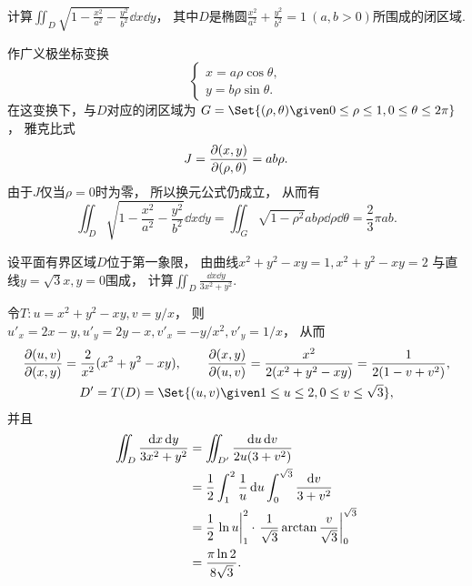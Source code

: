 \begin{example}
计算\(\iint_D \sqrt{1 - \frac{x^2}{a^2} - \frac{y^2}{b^2}} \dd{x} \dd{y}\)，
其中\(D\)是椭圆\(\frac{x^2}{a^2} + \frac{y^2}{b^2} = 1\ (a,b>0)\)所围成的闭区域.
\begin{solution}
作广义极坐标变换\[
	\left\{ \begin{array}{l}
		x = a \rho \cos\theta, \\
		y = b \rho \sin\theta.
	\end{array} \right.
\]
在这变换下，与\(D\)对应的闭区域为
\(G = \Set{(\rho,\theta) \given 0\leq\rho\leq1,0\leq\theta\leq2\pi}\)，
雅克比式\[
	J = \pdv{ (x,y) }{ (\rho,\theta) } = ab\rho.
\]
由于\(J\)仅当\(\rho=0\)时为零，
所以换元公式仍成立，
从而有\[
	\iint_D \sqrt{1 - \frac{x^2}{a^2} - \frac{y^2}{b^2}} \dd{x} \dd{y}
	= \iint_G \sqrt{1-\rho^2} ab\rho \dd{\rho} \dd{\theta}
	= \frac23 \pi ab.
\]
\end{solution}
\end{example}

\begin{example}
设平面有界区域\(D\)位于第一象限，
由曲线\(x^2+y^2-xy=1,
x^2+y^2-xy=2\)
与直线\(y=\sqrt3 x,
y=0\)围成，
计算\(\iint_D \frac{\dd{x}\dd{y}}{3x^2+y^2}\).
\begin{solution}
令\(T: u=x^2+y^2-xy,
v=y/x\)，
则\(u'_x=2x-y,
u'_y=2y-x,
v'_x=-y/x^2,
v'_y=1/x\)，
从而\begin{gather*}
	\jacobi{u,v}{x,y} = \frac2{x^2} (x^2+y^2-xy),
	\qquad
	\jacobi{x,y}{u,v} = \frac{x^2}{2(x^2+y^2-xy)}
	= \frac1{2(1-v+v^2)}, \\
	D' = T(D)
	= \Set{ (u,v) \given 1 \leq u \leq 2, 0 \leq v \leq \sqrt3 },
\end{gather*}
并且\begin{align*}
	\iint_D \frac{\dd{x}\dd{y}}{3x^2+y^2}
	&= \iint_{D'} \frac{\dd{u}\dd{v}}{2u(3+v^2)} \\
	&= \frac12 \int_1^2 \frac1u \dd{u} \int_0^{\sqrt3} \frac{\dd{v}}{3+v^2} \\
	&= \frac12 \eval{\ln u}_1^2 \cdot \eval{\frac1{\sqrt3} \arctan\frac{v}{\sqrt3}}_0^{\sqrt3} \\
	&= \frac{\pi \ln2}{8\sqrt3}.
\end{align*}
\end{solution}
\end{example}
